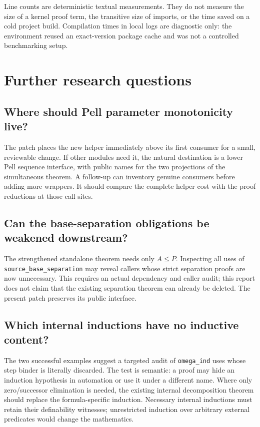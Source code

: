 \documentclass[11pt,letterpaper]{article}
\newcommand{\code}[1]{\nolinkurl{#1}}
\begin{document}
Line counts are deterministic textual measurements. They do not measure the
size of a kernel proof term, the transitive size of imports, or the time saved
on a cold project build. Compilation times in local logs are diagnostic only:
the environment reused an exact-version package cache and was not a controlled
benchmarking setup.

\section{Further research questions}

\subsection{Where should Pell parameter monotonicity live?}

The patch places the new helper immediately above its first consumer for a
small, reviewable change. If other modules need it, the natural destination
is a lower Pell sequence interface, with public names for the two projections
of the simultaneous theorem. A follow-up can inventory genuine consumers
before adding more wrappers. It should compare the complete helper cost with
the proof reductions at those call sites.

\subsection{Can the base-separation obligations be weakened downstream?}

The strengthened standalone theorem needs only $A\le P$. Inspecting all uses
of \code{source_base_separation} may reveal callers whose strict separation
proofs are now unnecessary. This requires an actual dependency and caller
audit; this report does not claim that the existing separation theorem can
already be deleted. The present patch preserves its public interface.

\subsection{Which internal inductions have no inductive content?}

The two successful examples suggest a targeted audit of \code{omega_ind}
uses whose step binder is literally discarded. The test is semantic: a proof
may hide an induction hypothesis in automation or use it under a different
name. Where only zero/successor elimination is needed, the existing internal
decomposition theorem should replace the formula-specific induction. Necessary
internal inductions must retain their definability witnesses; unrestricted
induction over arbitrary external predicates would change the mathematics.
\end{document}
